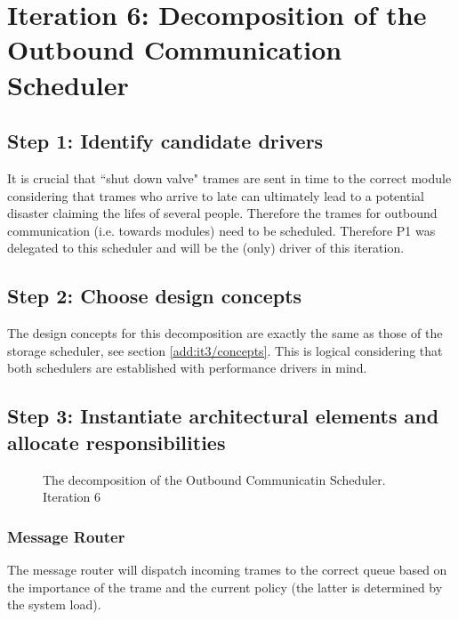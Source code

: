 \section{Iteration 6: Decomposition of the Outbound Communication Scheduler}
\label{add:it6}

\subsection{Step 1: Identify candidate drivers}
\label{add:it6/drivers}

\npar It is crucial that ``shut down valve" trames are sent in time to the
correct module considering that trames who arrive to late can ultimately
lead to a potential disaster claiming the lifes of several people. Therefore the
trames for outbound communication (i.e. towards modules) need to be
scheduled. Therefore P1 was delegated to this scheduler and will be the
(only) driver of this iteration.

\subsection{Step 2: Choose design concepts}
\label{add:it6/concepts}

\npar The design concepts for this decomposition are exactly the same as those
of the storage scheduler, see section \ref{add:it3/concepts}. This is logical
considering that both schedulers are established with performance drivers in
mind.

\subsection{Step 3: Instantiate architectural elements and allocate responsibilities}
\label{add:it6/elements}

\begin{figure}[H]
	\begin{centering}
		\caption{The decomposition of the Outbound Communicatin Scheduler. Iteration
		6}
		\label{fig:add/it6/decomposition}
	\end{centering}
\end{figure}

\subsubsection{Message Router}
\npar The message router will dispatch incoming trames to the correct queue
based on the importance of the trame and the current policy (the latter is
determined by the system load). 

